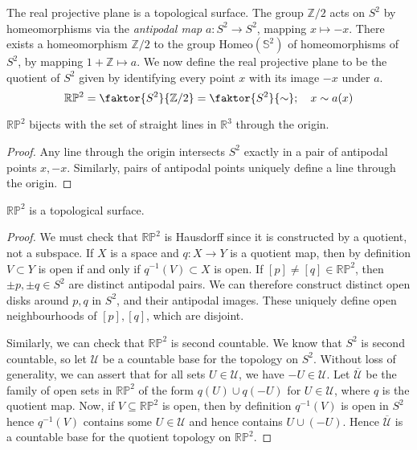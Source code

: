 \begin{example}
	The real projective plane is a topological surface.
	The group \( \mathbb Z / 2 \) acts on \( S^2 \) by homeomorphisms via the \textit{antipodal map} \( a \colon S^2 \to S^2 \), mapping \( x \mapsto -x \).
	There exists a homeomorphism \( \mathbb Z / 2 \) to the group \( \mathrm{Homeo}(\mathbb S^2) \) of homeomorphisms of \( S^2 \), by mapping \( 1 + \mathbb Z \mapsto a \).
	We now define the real projective plane to be the quotient of \( S^2 \) given by identifying every point \( x \) with its image \( -x \) under \( a \).
	\[ \mathbb R \mathbb P^2 = \faktor{S^2}{\mathbb Z/2} = \faktor{S^2}{\sim};\quad x \sim a(x) \]
	\begin{lemma}
		\( \mathbb R \mathbb P^2 \) bijects with the set of straight lines in \( \mathbb R^3 \) through the origin.
	\end{lemma}
	\begin{proof}
		Any line through the origin intersects \( S^2 \) exactly in a pair of antipodal points \( x, -x \).
		Similarly, pairs of antipodal points uniquely define a line through the origin.
	\end{proof}
	\begin{lemma}
		\( \mathbb R \mathbb P^2 \) is a topological surface.
	\end{lemma}
	\begin{proof}
		We must check that \( \mathbb R \mathbb P^2 \) is Hausdorff since it is constructed by a quotient, not a subspace.
		If \( X \) is a space and \( q \colon X \to Y \) is a quotient map, then by definition \( V \subset Y \) is open if and only if \( q^{-1}(V) \subset X \) is open.
		If \( [p] \neq [q] \in \mathbb R \mathbb P^2 \), then \( \pm p, \pm q \in S^2 \) are distinct antipodal pairs.
		We can therefore construct distinct open disks around \( p, q \) in \( S^2 \), and their antipodal images.
		These uniquely define open neighbourhoods of \( [p], [q] \), which are disjoint.

		Similarly, we can check that \( \mathbb R \mathbb P^2 \) is second countable.
		We know that \( S^2 \) is second countable, so let \( \mathcal U \) be a countable base for the topology on \( S^2 \).
		Without loss of generality, we can assert that for all sets \( U \in \mathcal U \), we have \( -U \in \mathcal U \).
		Let \( \overline{\mathcal U} \) be the family of open sets in \( \mathbb R \mathbb P^2 \) of the form \( q(U) \cup q(-U) \) for \( U \in \mathcal U \), where \( q \) is the quotient map.
		Now, if \( V \subseteq \mathbb R \mathbb P^2 \) is open, then by definition \( q^{-1}(V) \) is open in \( S^2 \) hence \( q^{-1}(V) \) contains some \( U \in \mathcal U \) and hence contains \( U \cup (-U) \).
		Hence \( \overline{\mathcal U} \) is a countable base for the quotient topology on \( \mathbb R \mathbb P^2 \).


\end{proof}
\end{example}
